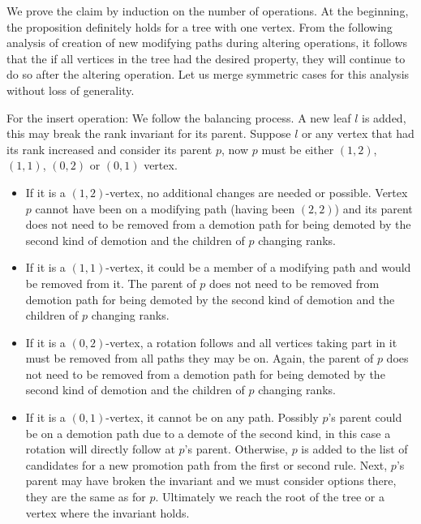 \begin{myproof}
We prove the claim by induction on the number of operations. At the beginning, the proposition definitely holds for a tree with one vertex. 
From the following analysis of creation of new modifying paths during altering operations, it follows that the if all vertices in the tree had the desired property, they will continue to do so after the altering operation.
Let us merge symmetric cases for this analysis without loss of generality.

For the insert operation: We follow the balancing process. A new leaf $l$ is added, this may break the rank invariant for its parent. Suppose $l$ or any vertex that had its rank increased and consider its parent $p$, now $p$ must be either $(1,2)$, $(1,1)$, $(0,2)$ or $(0,1)$ vertex. 

\begin{itemize}

\item If it is a $(1,2)$-vertex, no additional changes are needed or possible. 
Vertex $p$ cannot have been on a modifying path (having been $(2,2)$) and its parent does not need to be removed from a demotion path for being demoted by the second kind of demotion and the children of $p$ changing ranks.

\item If it is a $(1,1)$-vertex, it could be a member of a modifying path and would be removed from it. 
The parent of $p$ does not need to be removed from demotion path for being demoted by the second kind of demotion and the children of $p$ changing ranks.

\item If it is a $(0,2)$-vertex, a rotation follows and all vertices taking part in it must be removed from all paths they may be on.
Again, the parent of $p$ does not need to be removed from a demotion path for being demoted by the second kind of demotion and the children of $p$ changing ranks.

\item If it is a $(0,1)$-vertex, it cannot be on any path. 
Possibly $p$'s parent could be on a demotion path due to a demote of the second kind, in this case a rotation will directly follow at $p$'s parent. 
Otherwise, $p$ is added to the list of candidates for a new promotion path from the first or second rule. 
Next, $p$'s parent may have broken the invariant and we must consider options there, they are the same as for $p$. 
Ultimately we reach the root of the tree or a vertex where the invariant holds.


\end{itemize}
\end{myproof}
